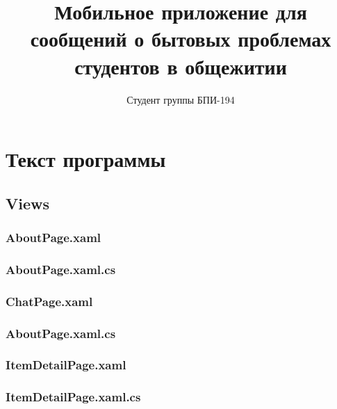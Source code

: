 \documentclass{../includes/TechDoc}
\title{Мобильное приложение для сообщений о бытовых проблемах студентов в общежитии}
\author{Студент группы БПИ-194}{В. А. Анненков}
\begin{document}
    \maketitle

    \tableofcontents


    \section{Текст программы}

    \subsection{Views}

    \subsubsection{AboutPage.xaml}
    

    \subsubsection{AboutPage.xaml.cs}
    

    \subsubsection{ChatPage.xaml}
    

    \subsubsection{AboutPage.xaml.cs}
    

    \subsubsection{ItemDetailPage.xaml}
    

    \subsubsection{ItemDetailPage.xaml.cs}
    
\end{document}
